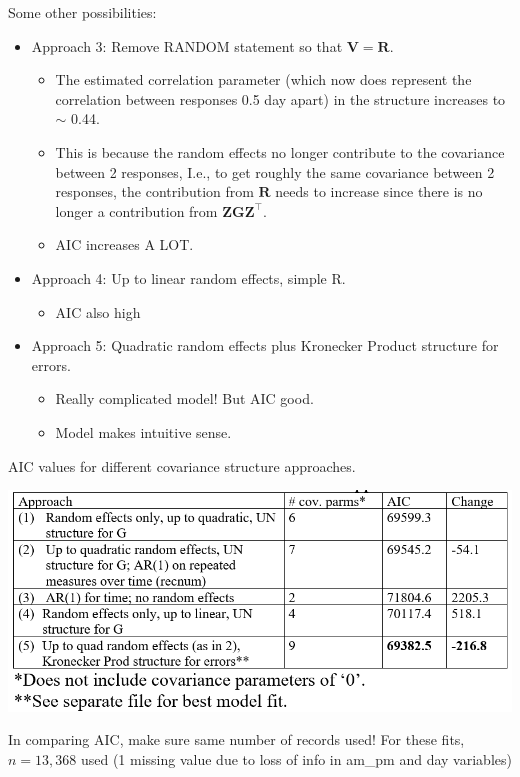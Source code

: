 \documentclass[
  9pt,
  ignorenonframetext,
]{beamer}
\providecommand{\tightlist}{%
  \setlength{\itemsep}{0pt}\setlength{\parskip}{0pt}}
\begin{document}
\begin{frame}{Some other possibilities:}
\protect\hypertarget{some-other-possibilities}{}
\begin{itemize}
\item
  Approach 3: Remove RANDOM statement so that \(\pmb V= \pmb R\).

  \begin{itemize}
  \item
    The estimated correlation parameter (which now does represent the
    correlation between responses 0.5 day apart) in the structure
    increases to \(\sim\) 0.44.
  \item
    This is because the random effects no longer contribute to the
    covariance between 2 responses, I.e., to get roughly the same
    covariance between 2 responses, the contribution from \(\pmb R\)
    needs to increase since there is no longer a contribution from
    \(\pmb {ZGZ}^{\top}\).
  \item
    AIC increases A LOT.
  \end{itemize}
\item
  Approach 4: Up to linear random effects, simple R.

  \begin{itemize}
  \tightlist
  \item
    AIC also high
  \end{itemize}
\item
  Approach 5: Quadratic random effects plus Kronecker Product structure
  for errors.

  \begin{itemize}
  \item
    Really complicated model! But AIC good.
  \item
    Model makes intuitive sense.
  \end{itemize}
\end{itemize}
\end{frame}

\begin{frame}{AIC values for different covariance structure approaches.}
\protect\hypertarget{aic-values-for-different-covariance-structure-approaches.}{}
\begin{center}\includegraphics[width=0.7\linewidth]{figs_L8/f3} \end{center}

In comparing AIC, make sure same number of records used! For these fits,
\(n=13,368\) used (1 missing value due to loss of info in am\_pm and day
variables)
\end{frame}
\end{document}
